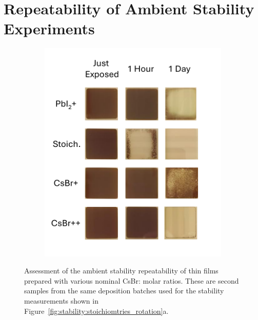 \chapter{Repeatability of Ambient Stability Experiments}\label{ch:appendixB}

\begin{figure}[htbp]
    \centering
    \begin{subfigure}[t]{0.5\textwidth}
        \centering
        \includegraphics[width=\textwidth]{chapters/appendixB/images/Stability_Rotation_Stoichiometries_v2.pdf} %
             
    \end{subfigure}

    \caption[Assessment of the ambient stability repeatability of  thin films prepared with various nominal CsBr: molar ratios.]{Assessment of the ambient stability repeatability of  thin films prepared with various nominal CsBr: molar ratios. These are second samples from the same deposition batches used for the stability measurements shown in Figure~\ref{fig:stability:stoichiomtries_rotation}a.}
    \label{fig:appendix:stoichiometry_rotation_V2}
\end{figure}


